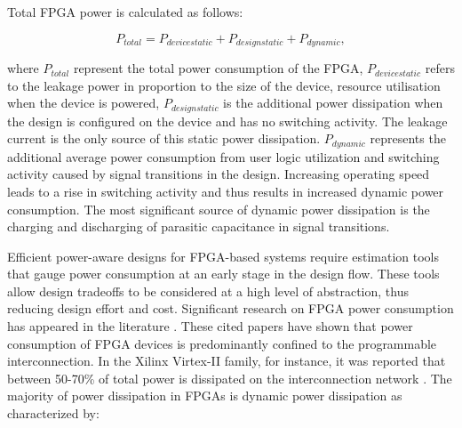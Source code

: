 Total FPGA power is calculated as follows: 
\begin{center}
\begin{equation}
\label{Equ:Ptotal}
 P_{total} = P_{device static} + P_{design static} + P_{dynamic},
\end{equation}
\end{center}
where $P_{total}$ represent the total power consumption of the FPGA, $P_{device static}$ refers to the leakage power in proportion to the size of the device, resource utilisation when the device is powered, $P_{design static}$ is the additional power dissipation when the design is configured on the device and has no switching activity. The leakage current is the only source of this static power dissipation.
$P_{dynamic}$ represents the additional average power consumption from user logic utilization and switching activity caused by signal transitions in the design. Increasing operating speed leads to a rise in switching activity and thus results in increased dynamic power consumption. The most significant source of dynamic power dissipation is the charging and discharging of parasitic capacitance in signal transitions.

Efficient power-aware designs for FPGA-based systems require estimation tools that gauge power consumption at an early stage in the design flow.
These tools allow design tradeoffs to be considered at a high level of abstraction, thus reducing design effort and cost.
Significant research on FPGA power consumption has appeared in the literature \cite {Shang2002,Anderson2004a,Anderson2004,Todorovich2005,Reimer2006}. 
These cited papers have shown that power consumption of FPGA devices is predominantly confined to the programmable interconnection. 
In the Xilinx Virtex-II family, for instance, it was reported that between 50-70\% of total power is dissipated on the interconnection network \cite{Shang2002}.
The majority of power dissipation in FPGAs is dynamic power dissipation \cite{Shang2002} as characterized by:

